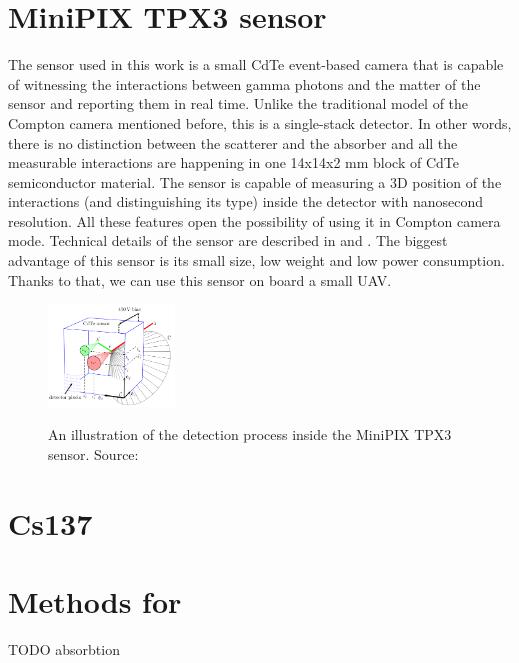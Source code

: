 \section{MiniPIX TPX3 sensor}
The sensor used in this work is a small CdTe event-based camera that is capable of witnessing the interactions between gamma photons and the matter of the sensor and reporting them in real time.
Unlike the traditional model of the Compton camera mentioned before, this is a single-stack detector.
In other words, there is no distinction between the scatterer and the absorber and all the measurable interactions are happening in one 14x14x2 mm block of CdTe semiconductor material.
The sensor is capable of measuring a 3D position of the interactions (and distinguishing its type) inside the detector with nanosecond resolution. 
All these features open the possibility of using it in Compton camera mode.
Technical details of the sensor are described in \cite{baca2021gamma} and \cite{baca2019timepix}.
The biggest advantage of this sensor is its small size, low weight and low power consumption.
Thanks to that, we can use this sensor on board a small UAV. 


\begin{figure}[!h]
    \centering
    \includegraphics[width=0.3\textwidth]{./fig/photos/minipix.png}
    \label{fig:minipix}
    \caption{An illustration of the detection process inside the MiniPIX TPX3 sensor. Source: \cite{baca2021gamma}}
\end{figure}

\section{Cs137}
\section{Methods for} 


TODO
absorbtion

